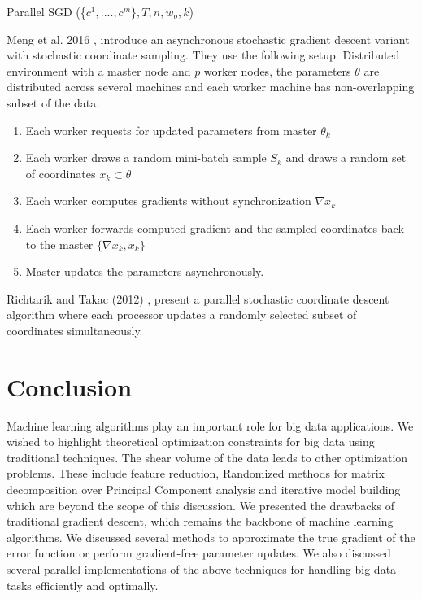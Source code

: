 \documentclass[sigconf]{acmart}
\begin{document}
\begin{algorithm}

\caption{Parallel SGD (\{$ c^1,....,c^m\} , T, n, w_o,k$)}\label{SGD}

\begin{algorithmic}[1] 
\EndFor
\EndWhile
\end{algorithmic}

\end{algorithm}

Meng et al. 2016 \cite{Meng}, introduce an asynchronous stochastic gradient descent variant with stochastic coordinate sampling. They use the following setup. Distributed environment with a master node and $p$ worker nodes, the parameters $\theta$ are distributed across several machines and each worker machine has non-overlapping subset of the data.

\begin{enumerate}
\item Each worker requests for updated parameters from master $\theta_k$
\item Each worker draws a random mini-batch sample $S_k$ and draws a random set of coordinates $x_k \subset \theta$
\item Each worker computes gradients without synchronization $\nabla x_k$
\item Each worker forwards computed gradient and the sampled coordinates back to the master $\{\nabla x_k , x_k \}$
\item Master updates the parameters asynchronously.
\end{enumerate}


Richtarik and Takac (2012) \cite{2012arXiv}, present a parallel stochastic coordinate descent algorithm where each processor updates a randomly selected subset of coordinates simultaneously. 

\section{Conclusion} \label{conclude}

Machine learning algorithms play an important role for big data applications. We wished to highlight theoretical optimization constraints for big data using traditional techniques. The shear volume of the data leads to other optimization problems. These include feature reduction, Randomized methods for matrix decomposition over Principal Component analysis and iterative model building which are beyond the scope of this discussion. We presented the drawbacks of traditional gradient descent, which remains the backbone of machine learning algorithms. We discussed several methods to approximate the true gradient of the error function or perform gradient-free parameter updates. We also discussed several parallel implementations of the above techniques for handling big data tasks efficiently and optimally. 
\end{document}
